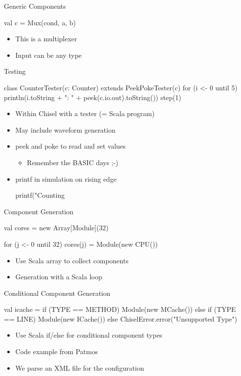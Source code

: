 \begin{frame}[fragile]{Generic Components}
\begin{chisel}
val c = Mux(cond, a, b)
\end{chisel}
\begin{itemize}
\item This is a multiplexer
\item Input can be any type
\end{itemize}
\end{frame}

\begin{frame}[fragile]{Testing}
\begin{chisel}
class CounterTester(c: Counter) extends PeekPokeTester(c) {
  for (i <- 0 until 5) {
    println(i.toString + ": " + peek(c.io.out).toString())
    step(1)
  }
}
\end{chisel}
\begin{itemize}
\item Within Chisel with a tester (= Scala program)
\item May include waveform generation
\item peek and poke to read and set values
\begin{itemize}
\item Remember the BASIC days ;-)
\end{itemize}
\item printf in simulation on rising edge
\begin{chisel}
printf("Counting %
\end{chisel}
\end{itemize}
\end{frame}

\begin{frame}[fragile]{Component Generation}
\begin{chisel}
val cores = new Array[Module](32)

for (j <- 0 until 32)
  cores(j) = Module(new CPU())
\end{chisel}
\begin{itemize}
\item Use Scala array to collect components
\item Generation with a Scala loop
\end{itemize}
\end{frame}

\begin{frame}[fragile]{Conditional Component Generation}
\begin{chisel}
val icache =
  if (TYPE == METHOD)
    Module(new MCache())
  else if (TYPE == LINE)
    Module(new ICache())
  else
    ChiselError.error("Unsupported Type")
\end{chisel}
\begin{itemize}
\item Use Scala if/else for conditional component types
\item Code example from Patmos
\item We parse an XML file for the configuration
\end{itemize}
\end{frame}

